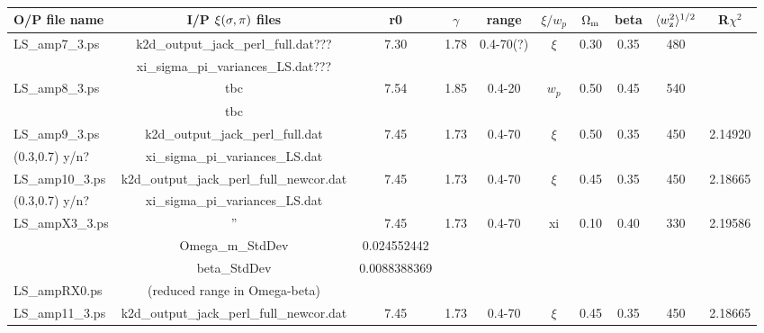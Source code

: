 \documentclass[usenatbib]{mn2e}
\begin{document}
\begin{table}
\begin{center}
\caption{}
\setlength{\tabcolsep}{1pt}
\begin{tabular}{lccccccccc}
\hline
\hline
O/P file name  &   I/P $\xi(\sigma, \pi)$ files                  &  r0  & $\gamma$ &  range    &  $\xi/w_p$ & $\Omega_{\rm m}$ & beta & $\langle w_{\rm z}^2\rangle^{1/2}$ & R$\chi^2$ \\

\hline
LS\_amp7\_3.ps & k2d\_output\_jack\_perl\_full.dat??? &	7.30 & 1.78      &  0.4-70(?) & $\xi$   &  0.30  & 0.35 & 480  & \\ 
               & xi\_sigma\_pi\_variances\_LS.dat???  &      &           &            &         &        &      &      & \\[8pt]
%
%
LS\_amp8\_3.ps & tbc                                  & 7.54 & 1.85      & 0.4-20     & $w_p$  &  0.50  & 0.45 & 540  & \\
               & tbc                                  &      &           &            &         &        &      &      & \\[8pt]
%
%
LS\_amp9\_3.ps & k2d\_output\_jack\_perl\_full.dat    & 7.45 & 1.73      & 0.4-70     & $\xi$   &  0.50	 & 0.35	& 450  & 2.14920  \\
(0.3,0.7) y/n? & xi\_sigma\_pi\_variances\_LS.dat     &      &           &            &         &        &      &      &          \\[8pt]
%
%
LS\_amp10\_3.ps & k2d\_output\_jack\_perl\_full\_newcor.dat & 7.45 &  1.73 & 0.4-70   & $\xi$	& 0.45	& 0.35	& 450	& 2.18665 \\
(0.3,0.7) y/n?  & xi\_sigma\_pi\_variances\_LS.dat          &      &       &          &         &       &       &       &         \\
%
LS\_ampX3\_3.ps	& ''                                        & 7.45          & 1.73    & 0.4-70   & xi      & 0.10  & 0.40 & 330  &  2.19586 \\
		& Omega\_m\_StdDev                          &  0.024552442  &         &          &         &       &      &      & \\
		& beta\_StdDev                              &  0.0088388369 &         &          &         &       &      &      & \\
%
LS\_ampRX0.ps   & (reduced range in Omega-beta)             &               &         &          &         &       &      &      & \\[8pt]
%
%
LS\_amp11\_3.ps	& k2d\_output\_jack\_perl\_full\_newcor.dat & 7.45          & 1.73 &  0.4-70 & $\xi$ & 0.45  & 0.35  & 450  & 2.18665 \\

\end{tabular}
\end{center}
\end{table}
\end{document}

